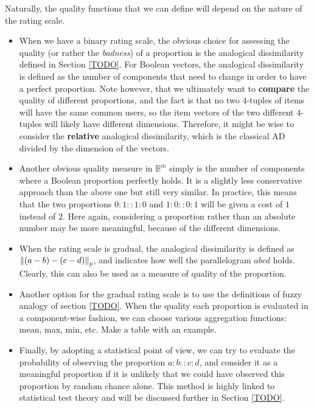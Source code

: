 Naturally, the quality functions that we can define will depend on the nature
of the rating scale.

\begin{itemize}
  \item When we have a binary rating scale, the obvious choice for assessing
    the quality (or rather the \textit{badness}) of a proportion is the
    analogical dissimilarity defined in Section \ref{TODO}. For Boolean
    vectors, the analogical dissimilarity is defined as the number of
    components that need to change in order to have a perfect proportion. Note
    however, that we ultimately want to \textbf{compare} the quality of
    different proportions, and the fact is that no two $4$-tuples of items will
    have the same common users, so the item vectors of the two different
    $4$-tuples will likely have different dimensions. Therefore, it might be
    wise to consider the \textbf{relative} analogical dissimilarity, which is
    the classical AD divided by the dimension of the vectors.
  \item Another obvious quality measure in $\mathbb{B}^m$ simply is the number
    of components where a Boolean proportion perfectly holds. It is a slightly
    less conservative approach than the above one but still very similar. In
    practice, this means that the two proportions $0:1::1:0$ and $1:0::0:1$
    will be given a cost of $1$ instead of $2$. Here again, considering a
    proportion rather than an absolute number may be more meaningful, because
    of the different dimensions.
  \item When the rating scale is gradual, the analogical dissimilarity is
    defined as $\norm{p}{(a - b) - (c - d)}$, and indicates how well the
    parallelogram $abcd$ holds. Clearly, this can also be used as a measure of
    quality of the proportion.
  \item Another option for the gradual rating scale is to use the definitions
    of fuzzy analogy of section \ref{TODO}. When the quality
    each proportion is evaluated in a component-wise fashion, we can choose
    various aggregation functions: mean, max, min, etc. Make a table with an
    example.
  \item Finally, by adopting a statistical point of view, we can try to
    evaluate the probability of observing the proportion $a:b::c:d$, and
    consider it as a meaningful proportion if it is unlikely that we could have
    observed this proportion by random chance alone. This method is highly
    linked to statistical test theory and will be discussed further in Section
    \ref{TODO}.
\end{itemize}

